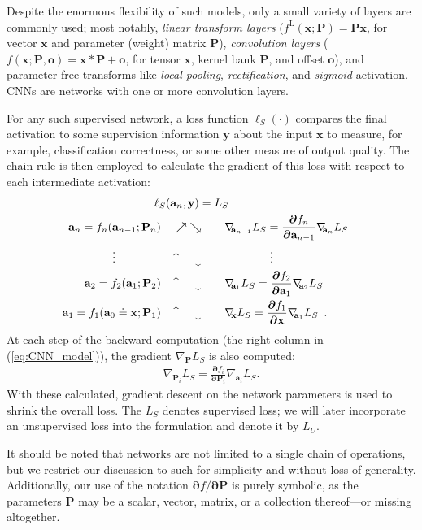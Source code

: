 \documentclass[10pt,twocolumn,letterpaper]{article}
\renewcommand{\vec}{\mathbf}
\newcommand{\Pdv}[2]{\ensuremath{\frac{\boldsymbol{\partial} #1}{\boldsymbol{\partial} #2}}}
\newcommand{\grad}[2]{\nabla_{\!\! #1} #2}
\newcommand{\loss}{\ensuremath{\ell}}
\newcommand{\x}{\vec{x}}
\newcommand{\y}{\vec{y}}
\renewcommand{\P}{\vec{P}}
\renewcommand{\a}{\vec{a}}
\renewcommand{\o}{\vec{o}}
\newcommand{\fL}{^{\text{L}}}
\begin{document}
Despite the enormous flexibility of such models, only a small variety of layers are commonly used; most notably, \textit{linear transform layers} ($f\fL(\x;\P)=\P\x$, for vector $\x$ and parameter (weight) matrix $\P$), \textit{convolution layers} ($f(\x;\P,\o)=\x*\P + \o$, for tensor $\x$, kernel bank $\P$, and offset $\o$), and parameter-free transforms like \textit{local pooling}, \textit{rectification}, and \textit{sigmoid} activation.
CNNs are networks with one or more convolution layers.

For any such supervised network, a loss function $\loss_S(\cdot)$ compares the final activation to some supervision information $\y$ about the input $\x$ to measure, for example, classification correctness, or some other measure of output quality. The chain rule is then employed to calculate the gradient of this loss with respect to each intermediate activation: 
\begin{alignat}{3}
\rlap{$\hspace{-0.2cm}\loss_S(\a_n,\y) = L_S$} 
\label{eq:CNN_model}\\
\a_n = f_n(\a_{n-1};\P_n) &\quad\nearrow\;\searrow\;&& \grad{\a_{n-1}}{L_S} = \Pdv{f_n}{\a_{n-1}}\grad{\a_n}{L_S}  \nonumber \\
\vdots \quad\quad\quad\quad &\quad\big\uparrow\quad\;\big\downarrow\quad&& \quad\quad\quad\quad \vdots \nonumber \\
\a_2 = f_2(\a_1;\P_2) &\quad\big\uparrow\quad\;\big\downarrow\quad&& \grad{\a_1}{L_S} = \Pdv{f_2}{\a_1}\grad{\a_2}{L_S} \nonumber \\
\a_1 = f_1(\a_0\doteq\x;\P_1) &\quad\big\uparrow\quad\;\big\downarrow\quad&& \grad{\x}{L_S} = \Pdv{f_1}{\x}\grad{\a_1}{L_S}
\enspace.
    \nonumber 
\end{alignat}
\noindent At each step of the backward computation (the right column in (\ref{eq:CNN_model})), the gradient $\grad{\P}{L_S}$ is also computed:
\begin{align}
\grad{\P_i}{L_S} = \Pdv{f_i}{\P_i}\grad{\a_i}{L_S}.
\label{eq:CNN_Pgrad}
\end{align}
With these calculated, gradient descent on the network parameters is used to shrink the overall loss.  
The $L_S$ denotes supervised loss;
we will later incorporate an unsupervised loss into the formulation and denote it by $L_U$.

It should be noted that networks are not limited to a single chain of operations, but we restrict our discussion to such for simplicity and without loss of generality. Additionally, our use of the notation $\boldsymbol{\partial}f/\boldsymbol{\partial}\P$ is purely symbolic, as the parameters $\P$ may be a scalar, vector, matrix, or a collection thereof---or missing altogether.   
\end{document}
